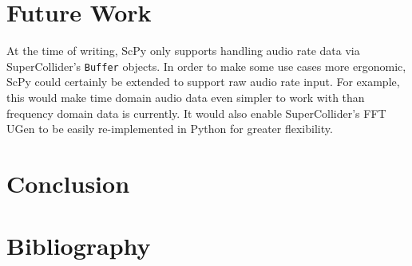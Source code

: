 \documentclass{article}
\begin{document}
\section{Future Work}

At the time of writing, ScPy only supports handling audio rate data via SuperCollider's
\texttt{Buffer} objects. In order to make some use cases more ergonomic, ScPy could certainly be
extended to support raw audio rate input. For example, this would make time domain audio data even
simpler to work with than frequency domain data is currently. It would also enable SuperCollider's
FFT UGen to be easily re-implemented in Python for greater flexibility.

\section{Conclusion}

\section{Bibliography}
\end{document}
